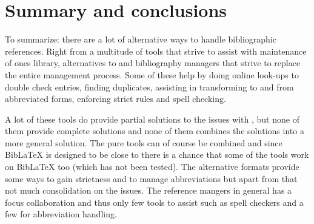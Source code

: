 







\section{Summary and conclusions}
To summarize: there are a lot of alternative ways to handle
bibliographic references.  Right from a multitude of tools that strive
to assist with maintenance of ones {\bibtex} library, alternatives to
{\bibtex} and bibliography managers that strive to replace the entire
management process.  Some of these help by doing online look-ups to
double check entries, finding duplicates, assisting in transforming to
and from abbreviated forms, enforcing strict rules and spell checking.

A lot of these tools do provide partial solutions to the issues with
{\bibtex}, but none of them provide complete solutions and none of
them combines the solutions into a more general solution.  The pure
{\bibtex} tools can of course be combined and since Bib{\LaTeX} is
designed to be close to {\bibtex} there is a chance that some of the
{\bibtex} tools work on Bib{\LaTeX} too (which has not been tested).  The
alternative formats provide some ways to gain strictness and to manage
abbreviations but apart from that not much consolidation on the
issues.  The reference mangers in general has a focus collaboration
and thus only few tools to assist such as spell checkers and a few for
abbreviation handling.


